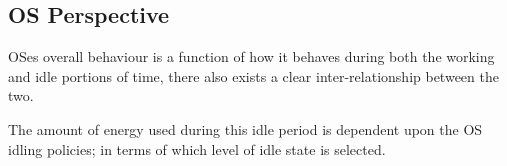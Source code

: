 \subsection{OS Perspective}
OSes overall behaviour is a function of how it behaves during both the working and idle portions of time, there also exists a clear inter-relationship between the two. 

The amount of energy used during this idle period is dependent upon the OS idling policies; in terms of which level of idle state is selected.


